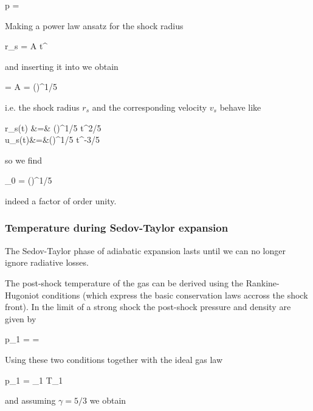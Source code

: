 \beq
p  = 
\eeq

Making a power law ansatz for the shock radius

\beq
r_s = A t^\eta
\eeq

\noindent and inserting it into  we obtain

\beq
\eta=  \quad A  = \left(\right)^{1/5}
\eeq

\noindent i.e. the shock radius $r_s$ and the corresponding velocity $v_s$
behave like

\beqn
r_s(t) &=& \left(\right)^{1/5} t^{2/5}\\
u_s(t)&=&\left(\right)^{1/5} t^{-3/5}
\eeqn

so we find

\beq
\ksi_0 = \left(\right)^{1/5} 
\eeq

indeed a factor of order unity.


\subsubsection{Temperature during Sedov-Taylor expansion}

The Sedov-Taylor phase of adiabatic expansion lasts until we can no longer ignore radiative
losses. %





The post-shock temperature of the gas can be derived using the Rankine-Hugoniot conditions (which express the basic conservation laws accross the shock front). In the limit
of a strong shock the post-shock pressure and density are given by

\beq
p_1 =   \quad {}=
\eeq

Using these two conditions together with the ideal gas law

\beq
p_1 =  \rho_1 T_1
\eeq

\noindent and assuming $\gamma = 5/3$ we obtain

